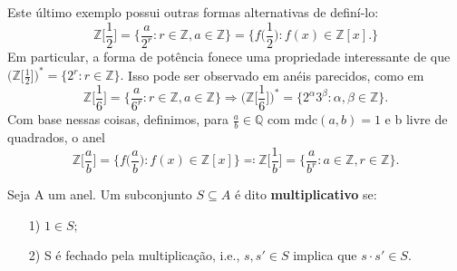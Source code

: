 \documentclass[AlgebraII/algebraII_notes.tex]{subfiles}
\begin{document}
Este último exemplo possui outras formas alternativas de definí-lo:
\[
	\mathbb{Z}\biggl[\frac{1}{2}\biggr] = \biggl\{\frac{a}{2^{r}}: r\in \mathbb{Z}, a\in \mathbb{Z}\biggr\} = \biggl\{f \biggl(\frac{1}{2}\biggr): f(x)\in \mathbb{Z}[x].\biggr\}
\]
Em particular, a forma de potência fonece uma propriedade interessante de que \(\biggl(\mathbb{Z}\biggl[\frac{1}{2}\biggr]\biggr)^{*} = \{2^{r}: r\in \mathbb{Z}\}.\) Isso pode ser observado
em anéis parecidos, como em
\[
	\mathbb{Z}\biggl[\frac{1}{6}\biggr] = \biggl\{\frac{a}{6^{r}}: r\in \mathbb{Z}, a\in \mathbb{Z}\biggr\} \Rightarrow \biggl(\mathbb{Z}\biggl[\frac{1}{6}\biggr]\biggr)^{*}=\{2^{\alpha }3^{\beta }:\alpha , \beta \in \mathbb{Z}\}.
\]
Com base nessas coisas, definimos, para \(\frac{a}{b}\in \mathbb{Q}\) com \(\mathrm{mdc}(a, b) = 1\) e b livre de quadrados, o anel
\[
	\mathbb{Z}\biggl[\frac{a}{b}\biggr] = \biggl\{f \biggl(\frac{a}{b}\biggr): f(x)\in \mathbb{Z}[x]\biggr\} \eqqcolon \mathbb{Z}\biggl[\frac{1}{b}\biggr] = \biggl\{\frac{a}{b^{r}}: a\in \mathbb{Z}, r\in \mathbb{Z}\biggr\}.
\]
\begin{def*}
	Seja A um anel. Um subconjunto \(S\subseteq A\) é dito \textbf{multiplicativo} se:
	\begin{itemize}
		\item[1)] \(1\in S;\)
		\item[2)] S é fechado pela multiplicação, i.e., \(s, s'\in S\) implica que \(s \cdot s'\in S.\)
	\end{itemize}
\end{def*}
\end{document}
